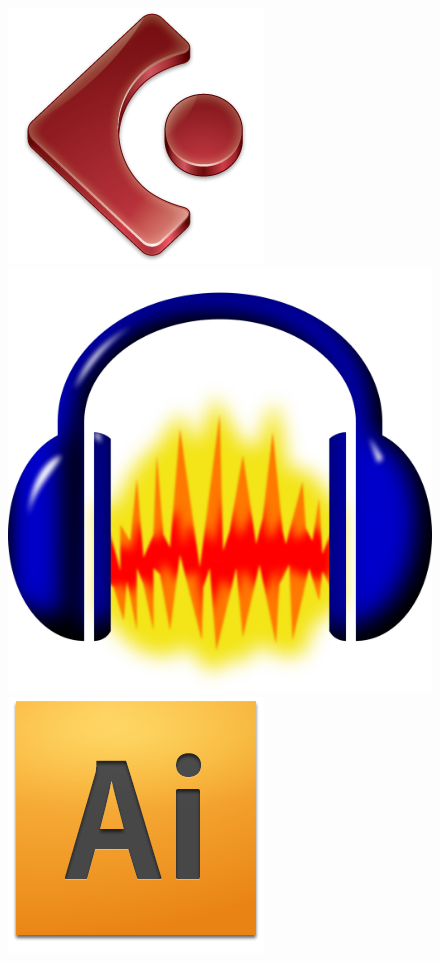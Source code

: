 \documentclass[11pt]{article} %
\begin{document}
\begin{figure}[!htp]
\begin{center}
  \includegraphics[scale=0.3]{res/cubase-Logo.png} \quad
  \includegraphics[scale=0.04]{res/audacity.png} \quad
  \includegraphics[scale=0.3]{res/adobe_illustrator.png} \quad

\end{center}
\end{figure}
\end{document}
